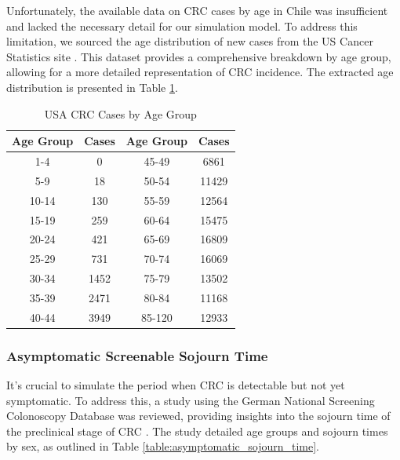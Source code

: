 Unfortunately, the available data on CRC cases by age in Chile was insufficient and lacked the necessary detail for our simulation model. To address this limitation, we sourced the age distribution of new cases from the US Cancer Statistics site \cite{noauthor_uscs_2024}. This dataset provides a comprehensive breakdown by age group, allowing for a more detailed representation of CRC incidence. The extracted age distribution is presented in Table \ref{table:cases_by_age_group}.
\begin{table}[H]
\caption{USA CRC Cases by Age Group}
\centering
\begin{tabular}{|c|c|c|c|}
\hline
Age Group & Cases & Age Group & Cases\\ \hline
1-4       & 0     & 45-49     & 6861\\ \hline
5-9       & 18    & 50-54     & 11429\\ \hline
10-14     & 130   & 55-59     & 12564\\ \hline
15-19     & 259   & 60-64     & 15475\\ \hline
20-24     & 421   & 65-69     & 16809\\ \hline
25-29     & 731   & 70-74     & 16069\\ \hline
30-34     & 1452  & 75-79     & 13502\\ \hline
35-39     & 2471  & 80-84     & 11168\\ \hline
40-44     & 3949  & 85-120    & 12933\\ \hline
\end{tabular}
\label{table:cases_by_age_group}
\end{table}

\subsubsection*{Asymptomatic Screenable Sojourn Time}

It's crucial to simulate the period when CRC is detectable but not yet symptomatic. To address this, a study using the German National Screening Colonoscopy Database was reviewed, providing insights into the sojourn time of the preclinical stage of CRC \cite{brenner_sojourn_2011}. The study detailed age groups and sojourn times by sex, as outlined in Table \ref{table:asymptomatic_sojourn_time}.

